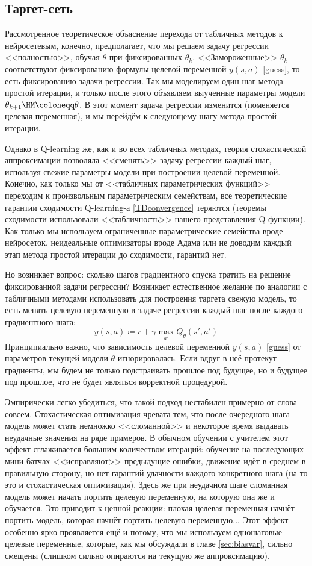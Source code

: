 \subsection{Таргет-сеть}

Рассмотренное теоретическое объяснение перехода от табличных методов к нейросетевым, конечно, предполагает, что мы решаем задачу регрессии <<полностью>>, обучая $\theta$ при фиксированных $\theta_k$. <<Замороженные>> $\theta_k$ соответствуют фиксированию формулы целевой переменной $y(s, a)$ \eqref{guess}, то есть фиксированию задачи регрессии. Так мы моделируем один шаг метода простой итерации, и только после этого объявляем выученные параметры модели $\theta_{k+1} \HM\coloneqq \theta$. В этот момент задача регрессии изменится (поменяется целевая переменная), и мы перейдём к следующему шагу метода простой итерации. 

Однако в Q-learning же, как и во всех табличных методах, теория стохастической аппроксимации позволяла <<сменять>> задачу регрессии каждый шаг, используя свежие параметры модели при построении целевой переменной. Конечно, как только мы от <<табличных параметрических функций>> переходим к произвольным параметрическим семействам, все теоретические гарантии сходимости Q-learning-а \ref{TDconvergence} теряются (теоремы сходимости использовали <<табличность>> нашего представления Q-функции). Как только мы используем ограниченные параметрические семейства вроде нейросеток, неидеальные оптимизаторы вроде Адама или не доводим каждый этап метода простой итерации до сходимости, гарантий нет.

Но возникает вопрос: сколько шагов градиентного спуска тратить на решение фиксированной задачи регрессии? Возникает естественное желание по аналогии с табличными методами использовать для построения таргета свежую модель, то есть менять целевую переменную в задаче регрессии каждый шаг после каждого градиентного шага:
$$y(s, a) \coloneqq r + \gamma \max_{a'} Q_{\theta}(s', a')$$
Принципиально важно, что зависимость целевой переменной $y(s, a)$ \eqref{guess} от параметров текущей модели $\theta$ игнорировалась. Если вдруг в неё протекут градиенты, мы будем не только подстраивать прошлое под будущее, но и будущее под прошлое, что не будет являться корректной процедурой. 

Эмпирически легко убедиться, что такой подход нестабилен примерно от слова совсем. Стохастическая оптимизация чревата тем, что после очередного шага модель может стать немножко <<сломанной>> и некоторое время выдавать неудачные значения на ряде примеров. В обычном обучении с учителем этот эффект сглаживается большим количеством итераций: обучение на последующих мини-батчах <<исправляют>> предыдущие ошибки, движение идёт в среднем в правильную сторону, но нет гарантий удачности каждого конкретного шага (на то это и стохастическая оптимизация). Здесь же при неудачном шаге сломанная модель может начать портить целевую переменную, на которую она же и обучается. Это приводит к цепной реакции: плохая целевая переменная начнёт портить модель, которая начнёт портить целевую переменную... Этот эффект особенно ярко проявляется ещё и потому, что мы используем одношаговые целевые переменные, которые, как мы обсуждали в главе \ref{sec:biasvar}, сильно смещены (слишком сильно опираются на текущую же аппроксимацию).

